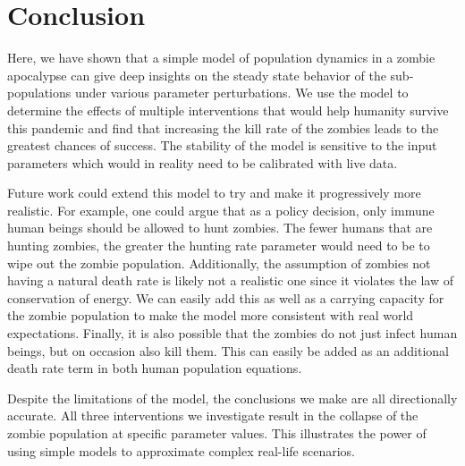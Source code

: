 \documentclass[
	12pt
]{article}
\begin{document}
\section{Conclusion}

Here, we have shown that a simple model of population dynamics in a zombie apocalypse can give deep insights on the steady state behavior of the sub-populations under various parameter perturbations. We use the model to determine the effects of multiple interventions that would help humanity survive this pandemic and find that increasing the kill rate of the zombies leads to the greatest chances of success. The stability of the model is sensitive to the input parameters which would in reality need to be calibrated with live data.

Future work could extend this model to try and make it progressively more realistic. For example, one could argue that as a policy decision, only immune human beings should be allowed to hunt zombies. The fewer humans that are hunting zombies, the greater the hunting rate parameter would need to be to wipe out the zombie population. Additionally, the assumption of zombies not having a natural death rate is likely not a realistic one since it violates the law of conservation of energy. We can easily add this as well as a carrying capacity for the zombie population to make the model more consistent with real world expectations. Finally, it is also possible that the zombies do not just infect human beings, but on occasion also kill them. This can easily be added as an additional death rate term in both human population equations.

Despite the limitations of the model, the conclusions we make are all directionally accurate. All three interventions we investigate result in the collapse of the zombie population at specific parameter values. This illustrates the power of using simple models to approximate complex real-life scenarios.
\end{document}
